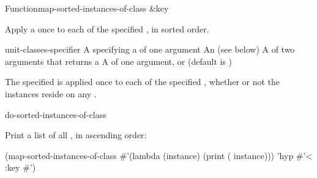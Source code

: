 \documentclass[10pt,twoside,english,pdftex]{article}
\begin{document}
\begin{functiondoc}{Function}{map-sorted-instances-of-class}%
{ \&key }
%
%

\fnsyntax

\fnpurpose Apply a  once to each 
of the specified , in sorted order.

\fnpackage {}

\fnmodule {}

\fnargs
\begin{args}{unit-classes-specifier}
\arg[function] A  specifying a
  of one argument
 An 
(see below)
\arg[predicate] A  of two arguments that returns a
\arg[key] A  of one argument, or \nil{} (default is \nil)
\end{args}

\fndsyntax
\W\supp\tabletop
\unitclassesspec
\subclassingspec

\fndescription  The specified  is applied once to each
 of the specified , whether
or not the instances reside on any .

\begin{alsos}{do-sorted-instances-of-class}
\end{alsos}

\fnexample
Print a list of all  , in ascending order:
%
\W\supp
\begin{example}
  (map-sorted-instances-of-class 
     #'(lambda (instance)
         (print ( instance)))
     'hyp #'< :key #')
\end{example} 

\end{functiondoc}

\end{document}
